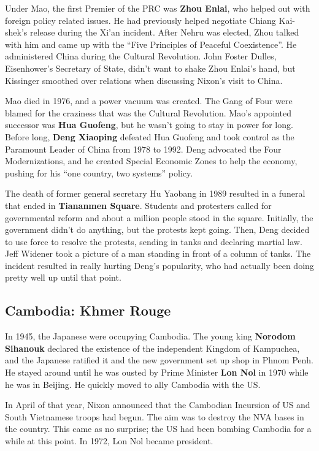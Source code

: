 Under Mao, the first Premier of the PRC was \textbf{Zhou Enlai},
who helped out with foreign policy related issues.
He had previously helped negotiate Chiang Kai-shek's release during the Xi'an incident.
After Nehru was elected, Zhou talked with him and came up with the ``Five Principles of Peaceful Coexistence''.
He administered China during the Cultural Revolution.
John Foster Dulles, Eisenhower's Secretary of State, didn't want to shake Zhou Enlai's hand,
but Kissinger smoothed over relations when discussing Nixon's visit to China.

Mao died in 1976, and a power vacuum was created.
The Gang of Four were blamed for the craziness that was the Cultural Revolution.
Mao's appointed successor was \textbf{Hua Guofeng}, but he wasn't going to stay in power for long.
Before long, \textbf{Deng Xiaoping} defeated Hua Guofeng
and took control as the Paramount Leader of China from 1978 to 1992.
Deng advocated the Four Modernizations, and he created Special Economic Zones to help the economy,
pushing for his ``one country, two systems'' policy.

The death of former general secretary Hu Yaobang in 1989
resulted in a funeral that ended in \textbf{Tiananmen Square}.
Students and protesters called for governmental reform and about a million people stood in the square.
Initially, the government didn't do anything, but the protests kept going.
Then, Deng decided to use force to resolve the protests, sending in tanks and declaring martial law.
Jeff Widener took a picture of a man standing in front of a column of tanks.
The incident resulted in really hurting Deng's popularity,
who had actually been doing pretty well up until that point.

\subsection*{Cambodia: Khmer Rouge}

In 1945, the Japanese were occupying Cambodia.
The young king \textbf{Norodom Sihanouk} declared the existence of the independent Kingdom of Kampuchea,
and the Japanese ratified it and the new government set up shop in Phnom Penh.
He stayed around until he was ousted by Prime Minister \textbf{Lon Nol} in 1970 while he was in Beijing.
He quickly moved to ally Cambodia with the US\@.

In April of that year, Nixon announced that the Cambodian Incursion of US and South Vietnamese troops had begun.
The aim was to destroy the NVA bases in the country.
This came as no surprise; the US had been bombing Cambodia for a while at this point.
In 1972, Lon Nol became president.

